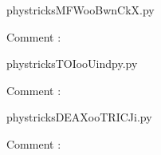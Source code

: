     \clearpage
    


    \newcommand{\CaptionFigMFWooBwnCkX}{<+Type your caption here+>}
    \begin{center}
        
    \end{center}
    phystricksMFWooBwnCkX.py

    Comment : 

    \clearpage
    


    \newcommand{\CaptionFigTOIooUindpy}{<+Type your caption here+>}
    \begin{center}
        
    \end{center}
    phystricksTOIooUindpy.py

    Comment : 

    \clearpage
    


    \newcommand{\CaptionFigDEAXooTRICJi}{<+Type your caption here+>}
    \begin{center}
        
    \end{center}
    phystricksDEAXooTRICJi.py

    Comment : 

    \clearpage
    
